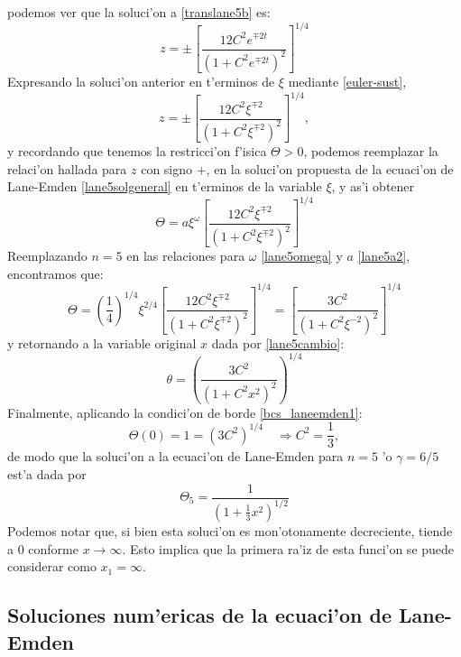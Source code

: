 podemos ver que la soluci'on a \eqref{translane5b} es:
\begin{equation}
 z=\pm\left[\frac{12C^2e^{\mp 2t}}{(1+C^2e^{\mp 2t})^2}\right]^{1/4}
\end{equation}
Expresando la soluci'on anterior en t'erminos de $\xi$ mediante \eqref{euler-sust},
\begin{equation}
 z=\pm\left[\frac{12C^2\xi^{\mp2}}{(1+C^2\xi^{\mp2})^2}\right]^{1/4},
\end{equation}
y recordando que tenemos la restricci'on f'isica $\Theta>0$, podemos reemplazar la relaci'on hallada para $z$ con signo $+$, en la soluci'on propuesta de la ecuaci'on de Lane-Emden \eqref{lane5solgeneral} en t'erminos de la variable $\xi$, y as'i obtener
\begin{equation}
 \Theta=a\xi^{\omega}\left[\frac{12C^2\xi^{\mp2}}{(1+C^2\xi^{\mp2})^2}\right]^{1/4}
\end{equation}
Reemplazando $n=5$ en las relaciones para $\omega$ \eqref{lane5omega} y $a$ \eqref{lane5a2}, encontramos que:
\begin{equation}
\Theta=\left(\frac{1}{4}\right)^{1/4}\xi^{2/4} \left[\frac{12C^2\xi^{\mp2}}{(1+C^2\xi^{\mp2})^2}\right]^{1/4}=\left[ \frac{3C^2}{(1+C^2\xi^{-2})^2}\right]^{1/4}
\end{equation}
y retornando a la variable original $x$ dada por \eqref{lane5cambio}:
\begin{equation}
\theta=\left(\frac{3C^2}{(1+C^2x^2)^2}\right)^{1/4}
\end{equation}
Finalmente, aplicando la condici'on de borde \eqref{bcs_laneemden1}:
\begin{equation}
 \Theta(0)=1=(3C^2)^{1/4}\quad\Rightarrow C^2=\frac{1}{3},
\end{equation}
de modo que la soluci'on a la ecuaci'on de Lane-Emden para $n=5$ 'o $\gamma=6/5$ est'a dada por
\begin{equation}\label{lane5}
\boxed{\Theta_5=\frac{1}{\left(1+\frac{1}{3}x^2\right)^{1/2}}}
\end{equation}
Podemos notar que, si bien esta soluci'on es mon'otonamente decreciente, tiende a $0$ conforme $x\to\infty$. Esto implica que la primera ra'iz de esta funci'on se puede considerar como $x_1=\infty$.

\subsection{Soluciones num'ericas de la ecuaci'on de Lane-Emden}\label{sec:lane-numerico}

